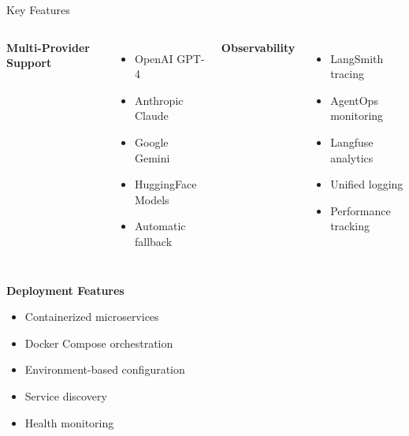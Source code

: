 \documentclass[aspectratio=169,11pt]{beamer}
\begin{document}
\begin{frame}{Key Features}
\begin{columns}
\textbf{ Multi-Provider Support}
\begin{itemize}
    \item OpenAI GPT-4
    \item Anthropic Claude
    \item Google Gemini
    \item HuggingFace Models
    \item Automatic fallback
\end{itemize}

\textbf{ Observability}
\begin{itemize}
    \item LangSmith tracing
    \item AgentOps monitoring
    \item Langfuse analytics
    \item Unified logging
    \item Performance tracking
\end{itemize}
\end{columns}

\vspace{0.5cm}

\textbf{ Deployment Features}
\begin{itemize}
    \item Containerized microservices
    \item Docker Compose orchestration
    \item Environment-based configuration
    \item Service discovery
    \item Health monitoring
\end{itemize}
\end{frame}
\end{document}
